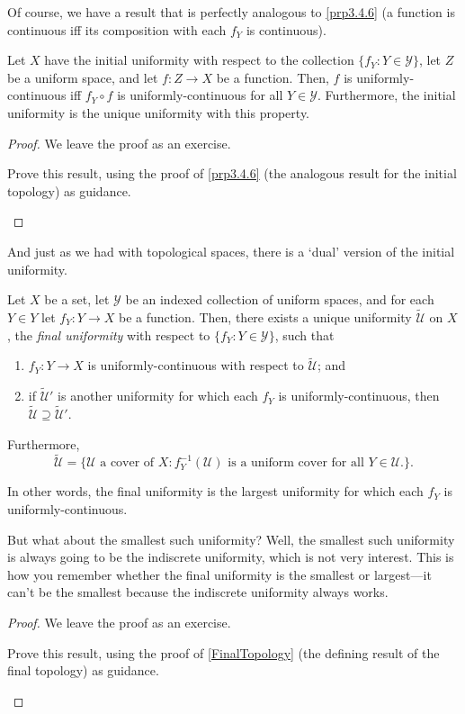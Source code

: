 Of course, we have a result that is perfectly analogous to \cref{prp3.4.6} (a function is continuous iff its composition with each $f_Y$ is continuous).
\begin{prp}\label{prp4.2.54}
Let $X$ have the initial uniformity with respect to the collection $\{ f_Y:Y\in \mathcal{Y}\}$, let $Z$ be a uniform space, and let $f:Z\rightarrow X$ be a function.  Then, $f$ is uniformly-continuous iff $f_Y\circ f$ is uniformly-continuous for all $Y\in \mathcal{Y}$.  Furthermore, the initial uniformity is the unique uniformity with this property.
\begin{proof}
We leave the proof as an exercise.
\begin{exr}
Prove this result, using the proof of \cref{prp3.4.6} (the analogous result for the initial topology) as guidance.
\end{exr}
\end{proof}
\end{prp}
And just as we had with topological spaces, there is a `dual' version of the initial uniformity.
\begin{prp}\label{FinalUniformity}
Let $X$ be a set, let $\mathcal{Y}$ be an indexed collection of uniform spaces, and for each $Y\in Y$ let $f_Y:Y\rightarrow X$ be a function.  Then, there exists a unique uniformity $\widetilde{\mathcal{U}}$ on $X$, the \emph{final uniformity} with respect to $\{ f_Y:Y\in \mathcal{Y}\}$, such that
\begin{enumerate}
\item $f_Y:Y\rightarrow X$ is uniformly-continuous with respect to $\widetilde{\mathcal{U}}$; and
\item if $\widetilde{\mathcal{U}}'$ is another uniformity for which each $f_Y$ is uniformly-continuous, then $\widetilde{\mathcal{U}}\supseteq \widetilde{\mathcal{U}}'$.
\end{enumerate}
Furthermore,
\begin{equation}
\widetilde{\mathcal{U}}=\{ \mathcal{U}\text{ a cover of }X:f_Y^{-1}(\mathcal{U})\text{ is a uniform cover for all }Y\in \mathcal{U}\text{.}\} .
\end{equation}
\begin{rmk}
In other words, the final uniformity is the largest uniformity for which each $f_Y$ is uniformly-continuous.
\end{rmk}
\begin{rmk}
But what about the smallest such uniformity?  Well, the smallest such uniformity is always going to be the indiscrete uniformity, which is not very interest.  This is how you remember whether the final uniformity is the smallest or largest---it can't be the smallest because the indiscrete uniformity always works.
\end{rmk}
\begin{proof}
We leave the proof as an exercise.
\begin{exr}
Prove this result, using the proof of \cref{FinalTopology} (the defining result of the final topology) as guidance.
\end{exr}
\end{proof}
\end{prp}
